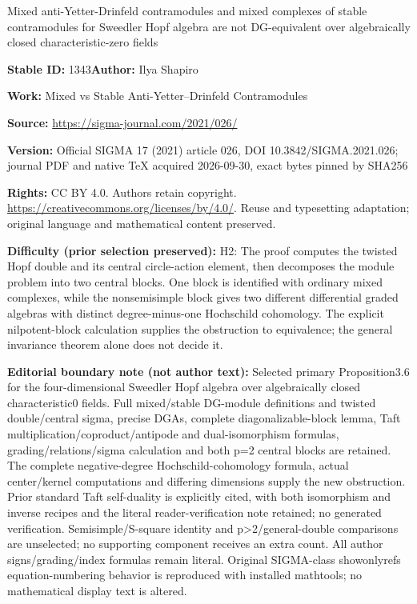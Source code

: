 \documentclass[11pt]{article}
\numberwithin{equation}{section}
\numberwithin{equation}{section}
\begin{document}
\begin{center}\Large Mixed anti-Yetter-Drinfeld contramodules and mixed complexes of stable contramodules for Sweedler Hopf algebra are not DG-equivalent over algebraically closed characteristic-zero fields\end{center}
\noindent\textbf{Stable ID:} 1343\quad\textbf{Author:} Ilya Shapiro\par
\noindent\textbf{Work:} Mixed vs Stable Anti-Yetter–Drinfeld Contramodules\par
\noindent\textbf{Source:} \url{https://sigma-journal.com/2021/026/}\par
\noindent\textbf{Version:} Official SIGMA 17 (2021) article 026, DOI 10.3842/SIGMA.2021.026; journal PDF and native TeX acquired 2026-09-30, exact bytes pinned by SHA256\par
\noindent\textbf{Rights:} CC BY 4.0. Authors retain copyright. \url{https://creativecommons.org/licenses/by/4.0/}. Reuse and typesetting adaptation; original language and mathematical content preserved.\par
\noindent\textbf{Difficulty (prior selection preserved):} {\CJKfont H2: The proof computes the twisted Hopf double and its central circle-action element, then decomposes the module problem into two central blocks. One block is identified with ordinary mixed complexes, while the nonsemisimple block gives two different differential graded algebras with distinct degree-minus-one Hochschild cohomology. The explicit nilpotent-block calculation supplies the obstruction to equivalence; the general invariance theorem alone does not decide it.}\par
\medskip\noindent\textbf{Editorial boundary note (not author text):} Selected primary Proposition3.6 for the four-dimensional Sweedler Hopf algebra over algebraically closed characteristic0 fields. Full mixed/stable DG-module definitions and twisted double/central sigma, precise DGAs, complete diagonalizable-block lemma, Taft multiplication/coproduct/antipode and dual-isomorphism formulas, grading/relations/sigma calculation and both p=2 central blocks are retained. The complete negative-degree Hochschild-cohomology formula, actual center/kernel computations and differing dimensions supply the new obstruction. Prior standard Taft self-duality is explicitly cited, with both isomorphism and inverse recipes and the literal reader-verification note retained; no generated verification. Semisimple/S-square identity and p>2/general-double comparisons are unselected; no supporting component receives an extra count. All author signs/grading/index formulas remain literal. Original SIGMA-class showonlyrefs equation-numbering behavior is reproduced with installed mathtools; no mathematical display text is altered.\par
\end{document}
